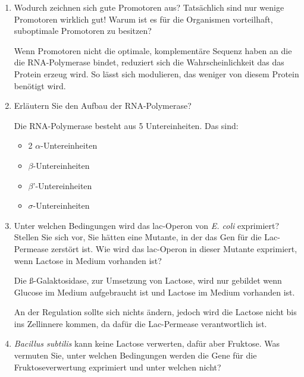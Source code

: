\begin{enumerate}
	\item Wodurch zeichnen sich gute Promotoren aus? Tatsächlich sind nur wenige Promotoren wirklich gut! Warum ist es für die Organismen vorteilhaft, suboptimale Promotoren zu besitzen? 

		Wenn Promotoren nicht die optimale, komplementäre Sequenz haben an die die RNA-Polymerase bindet,
		reduziert sich die Wahrscheinlichkeit das das Protein erzeug wird.
		So lässt sich modulieren,
		das weniger von diesem Protein benötigt wird.

	\item Erläutern Sie den Aufbau der RNA-Polymerase?	

		Die RNA-Polymerase besteht aus 5 Untereinheiten.
		Das sind:
		\begin{itemize}
			\item 2 \begin{math}\alpha\end{math}-Untereinheiten
			\item \begin{math}\beta\end{math}-Untereinheiten
			\item \begin{math}\beta\end{math}'-Untereinheiten
			\item \begin{math}\sigma\end{math}-Untereinheiten
		\end{itemize}

	\item Unter welchen Bedingungen wird das lac-Operon von \emph{E. coli} exprimiert? Stellen Sie sich vor, Sie hätten eine Mutante, in der das Gen für die Lac-Permease zerstört ist. Wie wird das lac-Operon in dieser Mutante exprimiert, wenn Lactose in Medium vorhanden ist?
	
		Die ß-Galaktosidase, zur Umsetzung von  Lactose,
		wird nur gebildet wenn Glucose im Medium aufgebraucht ist und 
		Lactose im Medium vorhanden ist.
		
		An der Regulation sollte sich nichts ändern,
		jedoch wird die Lactose nicht bis ins Zellinnere kommen,
		da dafür die Lac-Permease verantwortlich ist.
		
	\item \emph{Bacillus subtilis} kann keine Lactose verwerten, dafür aber Fruktose. Was vermuten Sie, unter welchen Bedingungen werden die Gene für die Fruktoseverwertung exprimiert und unter welchen nicht?	


\end{enumerate}
